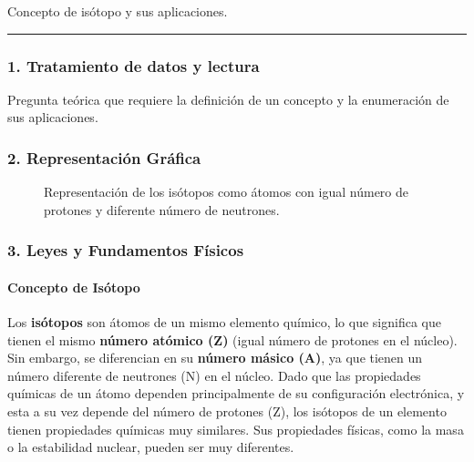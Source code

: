 \begin{cajaenunciado}
Concepto de isótopo y sus aplicaciones.
\end{cajaenunciado}
\hrule

\subsubsection*{1. Tratamiento de datos y lectura}
Pregunta teórica que requiere la definición de un concepto y la enumeración de sus aplicaciones.

\subsubsection*{2. Representación Gráfica}
\begin{figure}[H]
    \centering
    \caption{Representación de los isótopos como átomos con igual número de protones y diferente número de neutrones.}
\end{figure}

\subsubsection*{3. Leyes y Fundamentos Físicos}
\paragraph*{Concepto de Isótopo}
Los \textbf{isótopos} son átomos de un mismo elemento químico, lo que significa que tienen el mismo \textbf{número atómico (Z)} (igual número de protones en el núcleo). Sin embargo, se diferencian en su \textbf{número másico (A)}, ya que tienen un número diferente de neutrones (N) en el núcleo.
Dado que las propiedades químicas de un átomo dependen principalmente de su configuración electrónica, y esta a su vez depende del número de protones (Z), los isótopos de un elemento tienen propiedades químicas muy similares. Sus propiedades físicas, como la masa o la estabilidad nuclear, pueden ser muy diferentes.

